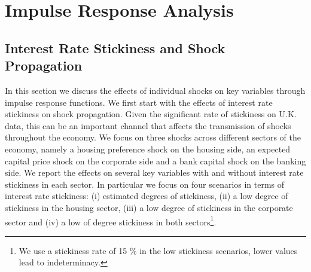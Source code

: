 \documentclass[12pt]{article}
\numberwithin{equation}{section}
\begin{document}

\FloatBarrier


\section{Impulse Response Analysis}

\subsection{Interest Rate Stickiness and Shock Propagation}

In this section we discuss the effects of individual shocks on key variables through impulse response functions. We first start with the effects of interest rate stickiness on shock propagation. Given the significant rate of stickiness on U.K. data, this can be an important channel that affects the transmission of shocks throughout the economy. We focus on three shocks across different sectors of the economy, namely a housing preference shock on the housing side, an expected capital price shock on the corporate side and a bank capital shock on the banking side. We report the effects on several key variables with and without interest rate stickiness in each sector. In particular we focus on four scenarios in terms of interest rate stickiness: (i) estimated degrees of stickiness, (ii) a low degree of stickiness in the housing sector, (iii) a low degree of stickiness in the corporate sector and (iv) a low of degree stickiness in both sectors\footnote{We use a stickiness rate of 15 \% in the low stickiness scenarios, lower values lead to indeterminacy.}. 
\end{document}
